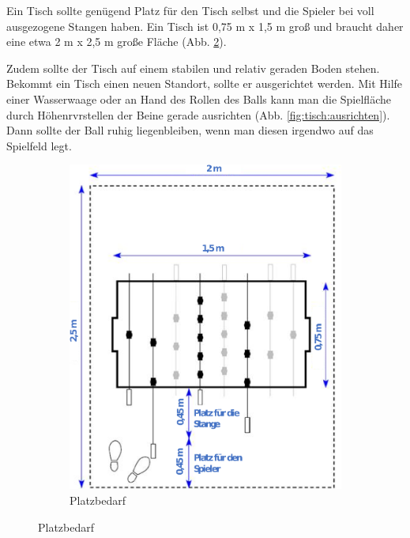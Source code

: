 Ein Tisch sollte genügend Platz für den Tisch selbst und die Spieler bei voll ausgezogene Stangen haben. Ein Tisch ist  0,75 m x 1,5 m groß und braucht daher eine etwa 2 m x 2,5 m große Fläche (Abb. \ref{fig:tisch:platzbedarf}).

Zudem sollte der Tisch auf einem stabilen und relativ geraden Boden stehen. Bekommt ein Tisch einen neuen Standort, sollte er ausgerichtet werden. Mit Hilfe einer Wasserwaage oder an Hand des Rollen des Balls kann man die Spielfläche durch Höhenrvrstellen der Beine gerade ausrichten (Abb. \ref{fig:tisch:ausrichten}). Dann sollte der Ball ruhig liegenbleiben, wenn man diesen irgendwo auf das Spielfeld legt.

\begin{figure}
    \centering 
        \begin{subfigure}[b]{0.7\textwidth} 
            \includegraphics[width=\textwidth]{img/tisch_platzbedarf.png} 
            \caption{Platzbedarf} 
            \label{fig:tisch:platzbedarf} 
            \vspace{0.5cm}

\end{subfigure}
\end{figure}
